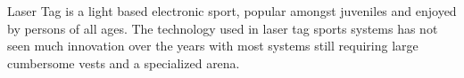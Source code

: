 Laser Tag is a light based electronic sport, popular amongst juveniles and enjoyed by persons of all ages. The technology used in laser tag sports systems has not seen much innovation over the years with most systems still requiring large cumbersome vests and a specialized arena.
